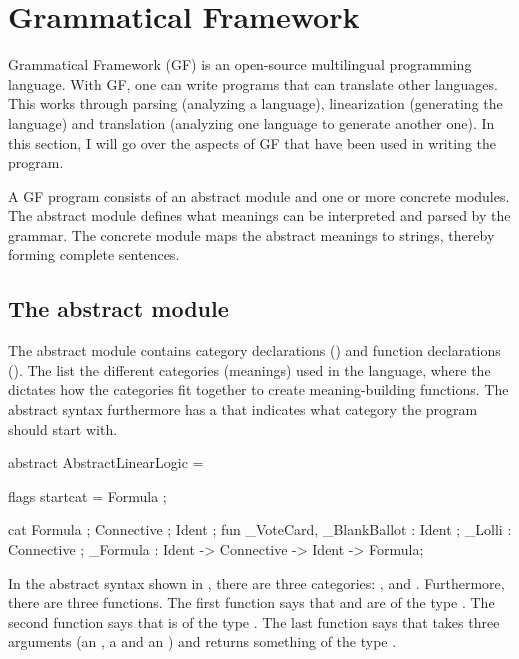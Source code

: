\section{Grammatical Framework}
\label{03_02}

Grammatical Framework (GF) is an open-source multilingual programming language. With GF, one can write programs that can translate other languages. This works through parsing (analyzing a language), linearization (generating the language) and translation (analyzing one language to generate another one). In this section, I will go over the aspects of GF that have been used in writing the program.

A GF program consists of an abstract module and one or more concrete modules. The abstract module defines what meanings can be interpreted and parsed by the grammar. The concrete module maps the abstract meanings to strings, thereby forming complete sentences.

\subsection{The abstract module}
\label{03_02_01}

The abstract module contains category declarations () and function declarations (). The  list the different categories (meanings) used in the language, where the  dictates how the categories fit together to create meaning-building functions. The abstract syntax furthermore has a  that indicates what category the program should start with. 

\begin{lstgf}
abstract AbstractLinearLogic = {
    flags startcat = Formula ;
    
    cat 
        Formula ; Connective ; Ident ;
    fun 
        _VoteCard, _BlankBallot : Ident ;
        _Lolli : Connective ;
        _Formula : Ident -> Connective -> Ident -> Formula;
}
\end{lstgf}

In the abstract syntax shown in , there are three categories: ,  and . Furthermore, there are three functions. The first function says that  and  are of the type . The second function says that  is of the type . The last function says that  takes three arguments (an , a  and an ) and returns something of the type .

